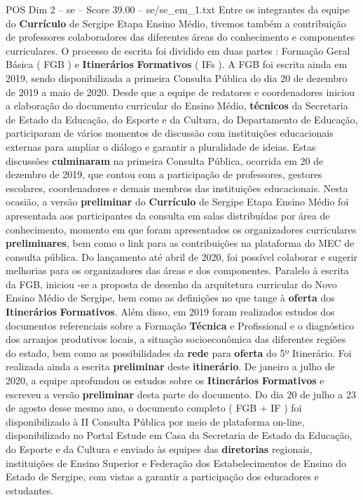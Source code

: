 \begin{textsample}{POS Dim 2 – se – Score 39.00 – se/se\_em\_1.txt}
Entre os integrantes da equipe do \textbf{Currículo} de Sergipe Etapa Ensino Médio, tivemos também a contribuição de professores colaboradores das diferentes áreas do conhecimento e componentes curriculares.
O processo de escrita foi dividido em duas partes : Formação Geral Básica ( FGB ) e \textbf{Itinerários} \textbf{Formativos} ( IFs ).
A FGB foi escrita ainda em 2019, sendo disponibilizada a primeira Consulta Pública do dia 20 de dezembro de 2019 a maio de 2020.
Desde que a equipe de redatores e coordenadores iniciou a elaboração do documento curricular do Ensino Médio, \textbf{técnicos} da Secretaria de Estado da Educação, do Esporte e da Cultura, do Departamento de Educação, participaram de vários momentos de discussão com instituições educacionais externas para ampliar o diálogo e garantir a pluralidade de ideias.
Estas discussões \textbf{culminaram} na primeira Consulta Pública, ocorrida em 20 de dezembro de 2019, que contou com a participação de professores, gestores escolares, coordenadores e demais membros das instituições educacionais.
Nesta ocasião, a versão \textbf{preliminar} do \textbf{Currículo} de Sergipe Etapa Ensino Médio foi apresentada aos participantes da consulta em salas distribuídas por área de conhecimento, momento em que foram apresentados os organizadores curriculares \textbf{preliminares}, bem como o link para as contribuições na plataforma do MEC de consulta pública.
Do lançamento até abril de 2020, foi possível colaborar e sugerir melhorias para os organizadores das áreas e dos componentes.
Paralelo à escrita da FGB, iniciou -se a proposta de desenho da arquitetura curricular do Novo Ensino Médio de Sergipe, bem como as definições no que tange à \textbf{oferta} dos \textbf{Itinerários} \textbf{Formativos}.
Além disso, em 2019 foram realizados estudos dos documentos referenciais sobre a Formação \textbf{Técnica} e Profissional e o diagnóstico dos arranjos produtivos locais, a situação socioeconômica das diferentes regiões do estado, bem como as possibilidades da \textbf{rede} para \textbf{oferta} do 5º Itinerário.
Foi realizada ainda a escrita \textbf{preliminar} deste \textbf{itinerário}.
De janeiro a julho de 2020, a equipe aprofundou os estudos sobre os \textbf{Itinerários} \textbf{Formativos} e escreveu a versão \textbf{preliminar} desta parte do documento.
Do dia 20 de julho a 23 de agosto desse mesmo ano, o documento completo ( FGB + IF ) foi disponibilizado à II Consulta Pública por meio de plataforma on-line, disponibilizado no Portal Estude em Casa da Secretaria de Estado da Educação, do Esporte e da Cultura e enviado às equipes das \textbf{diretorias} regionais, instituições de Ensino Superior e Federação dos Estabelecimentos de Ensino do Estado de Sergipe, com vistas a garantir a participação dos educadores e estudantes.

\end{textsample}

